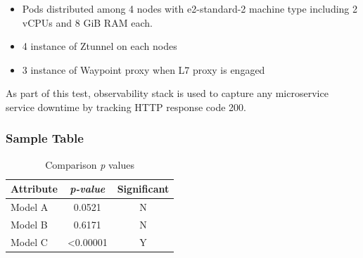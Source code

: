 \begin{itemize}
    \item Pods distributed among 4 nodes with e2-standard-2 machine type including 2 vCPUs and 8 GiB RAM each.
    \item 4 instance of Ztunnel on each nodes
    \item 3 instance of Waypoint proxy when L7 proxy is engaged
\end{itemize}

As part of this test, observability stack is used to capture any microservice service downtime by tracking HTTP response code 200. 

\subsubsection{Sample Table}
\begin{table}[ht!]
\centering
    
	\caption{Comparison \textit{p} values}
	\begin{tabular}{ |l|c|c|}	
		\hline		
		\textbf{Attribute} & \textbf{\textit{p-value}} & \textbf{Significant} \\ \hline
		Model A	 & 0.0521 & N \\ \hline
		Model B  & 0.6171 & N \\ \hline 
		Model C  & <0.00001 & Y \\ \hline 
	\end{tabular}
	\label{tab:pvalues}
\end{table} 

